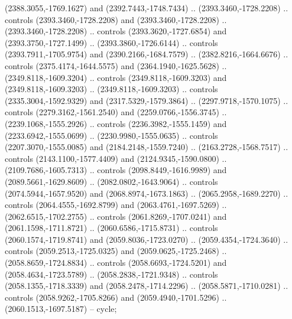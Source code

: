 \begin{scope}[shift={(-24.70323,-217.37029)}]
\begin{scope}[shift={(-1886.1309,2235.3934)}]
\begin{scope}[cm={{0.35985,0.0,0.0,0.35985,(1425.5269,-1101.8372)}}]
        (2388.3055,-1769.1627) and (2392.7443,-1748.7434) .. (2393.3460,-1728.2208) ..
        controls (2393.3460,-1728.2208) and (2393.3460,-1728.2208) ..
        (2393.3460,-1728.2208) .. controls (2393.3620,-1727.6854) and
        (2393.3750,-1727.1499) .. (2393.3860,-1726.6144) .. controls
        (2393.7911,-1705.9754) and (2390.2166,-1684.7579) .. (2382.8216,-1664.6676) ..
        controls (2375.4174,-1644.5575) and (2364.1940,-1625.5628) ..
        (2349.8118,-1609.3204) .. controls (2349.8118,-1609.3203) and
        (2349.8118,-1609.3203) .. (2349.8118,-1609.3203) .. controls
        (2335.3004,-1592.9329) and (2317.5329,-1579.3864) .. (2297.9718,-1570.1075) ..
        controls (2279.3162,-1561.2540) and (2259.0766,-1556.3745) ..
        (2239.1068,-1555.2926) .. controls (2236.3982,-1555.1459) and
        (2233.6942,-1555.0699) .. (2230.9980,-1555.0635) .. controls
        (2207.3070,-1555.0085) and (2184.2148,-1559.7240) .. (2163.2728,-1568.7517) ..
        controls (2143.1100,-1577.4409) and (2124.9345,-1590.0800) ..
        (2109.7686,-1605.7313) .. controls (2098.8449,-1616.9989) and
        (2089.5661,-1629.8609) .. (2082.0802,-1643.9064) .. controls
        (2074.5944,-1657.9520) and (2068.8974,-1673.1863) .. (2065.2958,-1689.2270) ..
        controls (2064.4555,-1692.8799) and (2063.4761,-1697.5269) ..
        (2062.6515,-1702.2755) .. controls (2061.8269,-1707.0241) and
        (2061.1598,-1711.8721) .. (2060.6586,-1715.8731) .. controls
        (2060.1574,-1719.8741) and (2059.8036,-1723.0270) .. (2059.4354,-1724.3640) ..
        controls (2059.2513,-1725.0325) and (2059.0625,-1725.2468) ..
        (2058.8659,-1724.8834) .. controls (2058.6693,-1724.5201) and
        (2058.4634,-1723.5789) .. (2058.2838,-1721.9348) .. controls
        (2058.1355,-1718.3339) and (2058.2478,-1714.2296) .. (2058.5871,-1710.0281) ..
        controls (2058.9262,-1705.8266) and (2059.4940,-1701.5296) ..
        (2060.1513,-1697.5187) -- cycle;


\end{scope}
\end{scope}
\end{scope}
